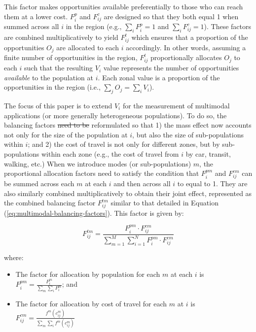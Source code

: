 \documentclass[10pt,letterpaper]{article}
\providecommand{\tightlist}{%
  \setlength{\itemsep}{0pt}\setlength{\parskip}{0pt}}
\providecommand{\DIFaddtex}[1]{{\protect\color{blue}\uwave{#1}}} %
\providecommand{\DIFdeltex}[1]{{\protect\color{red}\sout{#1}}}                      %
\providecommand{\DIFaddbegin}{} %
\providecommand{\DIFaddend}{} %
\providecommand{\DIFdelbegin}{} %
\providecommand{\DIFdelend}{} %
\providecommand{\DIFadd}[1]{\texorpdfstring{\DIFaddtex{#1}}{#1}} %
\providecommand{\DIFdel}[1]{\texorpdfstring{\DIFdeltex{#1}}{}} %
\newcommand{\DIFscaledelfig}{0.5}
\newlength{\DIFdelgraphicswidth} %
\newlength{\DIFdelgraphicsheight} %
\newcommand{\DIFaddincludegraphics}[2][]{{\color{blue}\fbox{\DIFOincludegraphics[#1]{#2}}}} %
\newcommand{\DIFdelincludegraphics}[2][]{%
\sbox{\DIFdelgraphicsbox}{\DIFOincludegraphics[#1]{#2}}%
\settoboxwidth{\DIFdelgraphicswidth}{\DIFdelgraphicsbox} %
\settoboxtotalheight{\DIFdelgraphicsheight}{\DIFdelgraphicsbox} %
\scalebox{\DIFscaledelfig}{%
\parbox[b]{\DIFdelgraphicswidth}{\usebox{\DIFdelgraphicsbox}\\[-\baselineskip] \rule{\DIFdelgraphicswidth}{0em}}\llap{\resizebox{\DIFdelgraphicswidth}{\DIFdelgraphicsheight}{%
\setlength{\unitlength}{\DIFdelgraphicswidth}%
\begin{picture}(1,1)%
\thicklines\linethickness{2pt} %
{\color[rgb]{1,0,0}\put(0,0){\framebox(1,1){}}}%
{\color[rgb]{1,0,0}\put(0,0){\line( 1,1){1}}}%
{\color[rgb]{1,0,0}\put(0,1){\line(1,-1){1}}}%
\end{picture}%
}\hspace*{3pt}}} %
} %
\DeclareRobustCommand{\DIFaddbegin}{\DIFOaddbegin \let\includegraphics\DIFaddincludegraphics} %
\DeclareRobustCommand{\DIFaddend}{\DIFOaddend \let\includegraphics\DIFOincludegraphics} %
\DeclareRobustCommand{\DIFdelbegin}{\DIFOdelbegin \let\includegraphics\DIFdelincludegraphics} %
\DeclareRobustCommand{\DIFdelend}{\DIFOaddend \let\includegraphics\DIFOincludegraphics} %
\begin{document}
This factor makes opportunities available preferentially to those who
can reach them at a lower cost. \(F^p_{i}\) and \(F^c_{ij}\) are
designed so that they both equal 1 when summed across all \(i\) in the
region (e.g., \(\sum_i F^p_{i} = 1\) and \(\sum_i F^c_{ij} = 1\)). These
factors are combined multiplicatively to yield \(F^t_{ij}\) which
ensures that a proportion of the opportunities \(O_j\) are allocated to
each \(i\) accordingly. In other words, assuming a finite number of
opportunities in the region, \(F^t_{ij}\) proportionally allocates
\(O_j\) to each \(i\) such that the resulting \(V_i\) value represents
the number of opportunities \emph{available} to the population at \(i\).
Each zonal value is a proportion of the opportunities in the region
(i.e., \(\sum_j O_j = \sum_i V_i\)).

The focus of this paper is to extend \(V_i\) for the measurement of
multimodal applications (or more generally heterogeneous populations).
To do so, the balancing factors \DIFdelbegin \DIFdel{need to be }\DIFdelend \DIFaddbegin \DIFadd{are }\DIFaddend reformulated so that 1) the mass
effect now accounts not only for the size of the population at \(i\),
but also the size of sub-populations within \(i\); and 2) the cost of
travel is not only for different zones, but by sub-populations within
each zone (e.g., the cost of travel from \(i\) by car, transit, walking,
etc.) \DIFaddbegin \DIFadd{relative to all zones. }\DIFaddend When we introduce modes (or
sub-populations) \(m\), the proportional allocation factors need to
satisfy the condition that \(F^{pm}_{i}\) and \(F^{cm}_{ij}\) can be
summed across each \(m\) at each \(i\) and then across all \(i\) to
equal to 1. They are also similarly combined multiplicatively to obtain
their joint effect, represented as the combined balancing factor
\(F^{tm}_{ij}\) similar to that detailed in Equation
(\ref{eq:multimodal-balancing-factors}). This factor is given by:

\begin{equation}
\label{eq:multimodal-balancing-factors}
F^{tm}_{ij} = \frac{F^{pm}_{i} \cdot F^{cm}_{ij}}{\sum_{m=1}^M \sum_{i=1}^N F^{pm}_{i} \cdot F^{cm}_{ij}}
\end{equation}

\noindent where:

\begin{itemize}
\tightlist
\item
  The factor for allocation by population for each \(m\) at each \(i\)
  is \(F^{pm}_{i} = \frac{P_{i}^m}{\sum_{m}\sum_{i} P_{i}^m}\); and
\item
  The factor for allocation by cost of travel for each \(m\) at \(i\) is
  \(F_{ij}^{cm} = \frac{f^m(c_{ij}^m)}{\sum_{m} \sum_{i} f^m(c_{ij}^m)}\)
\end{itemize}
\end{document}
